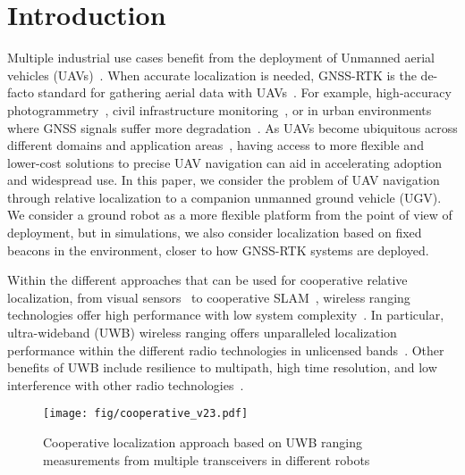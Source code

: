
\section{Introduction}\label{sec:introduction}

Multiple industrial use cases benefit from the deployment of Unmanned aerial vehicles (UAVs)~\cite{shakhatreh2019unmanned}. When accurate localization is needed, GNSS-RTK is the de-facto standard for gathering aerial data with UAVs~\cite{li2018high}. For example, high-accuracy photogrammetry~\cite{lee2018assessment}, civil infrastructure monitoring~\cite{kim2018structural}, or in urban environments where GNSS signals suffer more degradation~\cite{li2018high}. As UAVs become ubiquitous across different domains and application areas~\cite{queralta2020collaborative}, having access to more flexible and lower-cost solutions to precise UAV navigation can aid in accelerating adoption and widespread use. In this paper, we consider the problem of UAV navigation through relative localization to a companion unmanned ground vehicle (UGV). We consider a ground robot as a more flexible platform from the point of view of deployment, but in simulations, we also consider localization based on fixed beacons in the environment, closer to how GNSS-RTK systems are deployed.

Within the different approaches that can be used for cooperative relative localization, from visual sensors~\cite{hui2013autonomous} to cooperative SLAM~\cite{kim2019uav}, wireless ranging technologies offer high performance with low system complexity~\cite{queralta2020uwb}. In particular, ultra-wideband (UWB) wireless ranging offers unparalleled localization performance within the different radio technologies in unlicensed bands~\cite{shule2020uwb}. Other benefits of UWB include resilience to multipath, high time resolution, and low interference with other radio technologies~\cite{yu2021applications}.

\begin{figure}
    \centering
    \texttt{[image: fig/cooperative\_v23.pdf]}
    \caption{Cooperative localization approach based on UWB ranging measurements from multiple transceivers in different robots}
    \label{fig:concept}
\end{figure}

